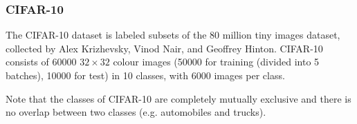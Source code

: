 \documentclass[12pt,a4paper]{article}
\theoremstyle{definition}
\begin{document}
\begin{appendix}
\subsubsection{CIFAR-10 \cite{cifar-10}}

The CIFAR-10 dataset is labeled subsets of the 80 million tiny images dataset, collected by Alex Krizhevsky, Vinod Nair, and Geoffrey Hinton. CIFAR-10 consists of 60000 $32 \times 32$ colour images (50000 for training (divided into 5 batches), 10000 for test) in 10 classes, with 6000 images per class.


\vspace{0.01\linewidth}
Note that the classes of CIFAR-10 are completely mutually exclusive and there is no overlap between two classes (e.g. automobiles and trucks).


\end{appendix}



\end{document}
